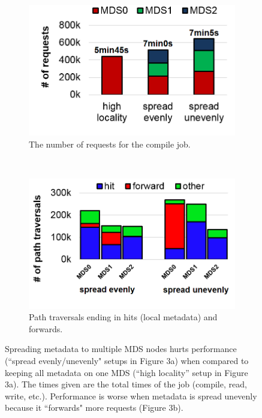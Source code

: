 \begin{figure}[tbh]
	\begin{subfigure}[H]{0.45\textwidth}
		\centering	
	\caption{The number of requests for the compile job.  \label{figure:workload-tar-requests-total}}
		
\includegraphics[width=1\textwidth]{./chapters/mantle/figures/workload-tar-requests2.png}
	\end{subfigure}
	~
	\begin{subfigure}[H]{0.47\textwidth}
		\centering
		\caption{Path traversals ending in hits (local metadata) and forwards. \label{figure:workload-tar-traverses}}	
	\includegraphics[width=1\textwidth]{./chapters/mantle/figures/workload-tar-traverses2.png}
	\end{subfigure}	
	\caption{Spreading metadata to multiple MDS nodes hurts performance (``spread evenly/unevenly" setups in Figure 3a) when compared to keeping all metadata on one MDS (``high locality'' setup in Figure 3a). The times given are the total times of the job (compile, read, write, etc.). Performance is worse when metadata is spread unevenly because it ``forwards" more requests (Figure 3b).\label{figure:workload-tar-requests}}
\end{figure}


